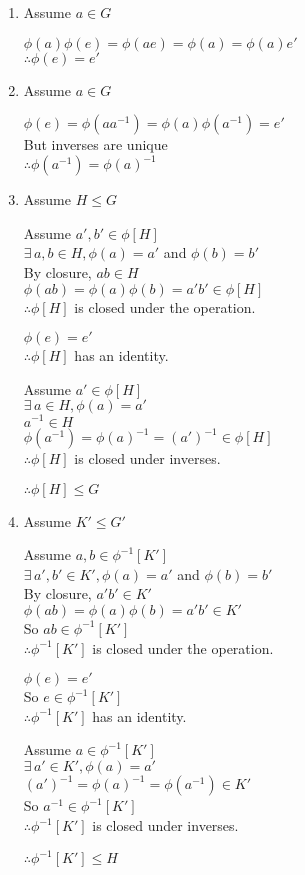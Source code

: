\documentclass[letterpaper,12pt,fleqn]{article}
\newcommand{\p}{\phi}
\begin{document}
\begin{theproof}
  \listbreak
  \begin{enumerate}
  \item Assume $a\in G$
    
    $\p(a)\p(e)=\p(ae)=\p(a)=\p(a)e'$ \\
    $\therefore\p(e)=e'$

  \item Assume $a\in G$

    $\p(e)=\p(aa^{-1})=\p(a)\p(a^{-1})=e'$ \\
    But inverses are unique \\
    $\therefore\p(a^{-1})=\p(a)^{-1}$

  \item Assume $H\le G$

    Assume $a',b'\in\p[H]$ \\
    $\exists\,a,b\in H,\p(a)=a'$ and $\p(b)=b'$ \\
    By closure, $ab\in H$ \\
    $\p(ab)=\p(a)\p(b)=a'b'\in\p[H]$ \\
    $\therefore \p[H]$ is closed under the operation.

    $\p(e)=e'$ \\
    $\therefore\p[H]$ has an identity.

    Assume $a'\in\p[H]$ \\
    $\exists\,a\in H,\p(a)=a'$ \\
    $a^{-1}\in H$ \\
    $\p(a^{-1})=\p(a)^{-1}=(a')^{-1}\in\p[H]$ \\
    $\therefore\p[H]$ is closed under inverses.

    $\therefore\p[H]\le G$

  \item Assume $K'\le G'$

    Assume $a,b\in\p^{-1}[K']$ \\
    $\exists\,a',b'\in K',\p(a)=a'$ and $\p(b)=b'$ \\
    By closure, $a'b'\in K'$ \\
    $\p(ab)=\p(a)\p(b)=a'b'\in K'$ \\
    So $ab\in\p^{-1}[K']$ \\
    $\therefore\p^{-1}[K']$ is closed under the operation.

    $\p(e)=e'$ \\
    So $e\in\p^{-1}[K']$ \\
    $\therefore\p^{-1}[K']$ has an identity.

    Assume $a\in\p^{-1}[K']$ \\
    $\exists\,a'\in K',\p(a)=a'$ \\
    $(a')^{-1}=\p(a)^{-1}=\p(a^{-1})\in K'$ \\
    So $a^{-1}\in\p^{-1}[K']$ \\
    $\therefore\p^{-1}[K']$ is closed under inverses.

    $\therefore\p^{-1}[K']\le H$
  \end{enumerate}
\end{theproof}
\end{document}
